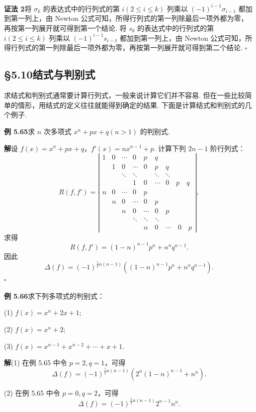 \documentclass[UTF8, 12pt, fontset=fandol, oneside]{ctexart}
\begin{document}
\noindent\textbf{证法 2}\quad 将 $\sigma_k$ 的表达式中的行列式的第 $i(2\le i\le k)$ 列乘以 $(-1)^{i-1}\sigma_{i-1}$ 都加到第一列上，由 Newton 公式可知，所得行列式的第一列除最后一项外都为零，再按第一列展开就可得到第一个结论. 将 $s_k$ 的表达式中的行列式的第 $i(2\le i\le k)$ 列乘以 $(-1)^{i-1}s_{i-1}$ 都加到第一列上，由 Newton 公式可知，所得行列式的第一列除最后一项外都为零，再按第一列展开就可得到第二个结论. \hfill $\square$

\subsection*{§5.10\quad 结式与判别式}

求结式和判别式通常要计算行列式，一般来说计算它们并不容易. 但在一些比较简单的情形，用结式的定义往往就能得到确定的结果. 下面是计算结式和判别式的几个例子.

\noindent\textbf{例 5.65}\quad 求 $n$ 次多项式 $x^n+px+q(n>1)$ 的判别式.

\noindent\textbf{解}\quad 设 $f(x)=x^n+px+q$，$f'(x)=nx^{n-1}+p$. 计算下列 $2n-1$ 阶行列式：
\[
R(f,f')=
\left|\begin{array}{ccccccc}
1 & 0 & \cdots & 0 & p & q & \\
 & 1 & 0 & \cdots & 0 & p & q\\
 & & \ddots & \ddots & & \ddots & \ddots\\
 & & & 1 & 0 & \cdots & 0\quad p\quad q\\
n & 0 & \cdots & 0 & p & & \\
 & n & 0 & \cdots & 0 & p & \\
 & & n & 0 & \cdots & 0 & p\\
 & & & \ddots & \ddots & \ddots & \\
 & & & & n & 0 & \cdots\quad 0\quad p
\end{array}\right|,
\]
求得
\[
R(f,f')=(1-n)^{n-1}p^n+n^nq^{n-1}.
\]
因此
\[
\Delta(f)=(-1)^{\frac12 n(n-1)}\left((1-n)^{n-1}p^n+n^nq^{n-1}\right).
\]
\hfill $\square$

\noindent\textbf{例 5.66}\quad 求下列多项式的判别式：

(1) $f(x)=x^n+2x+1$;

(2) $f(x)=x^n+2$;

(3) $f(x)=x^{n-1}+x^{n-2}+\cdots+x+1$.

\noindent\textbf{解}\quad (1) 在例 5.65 中令 $p=2,q=1$，可得
\[
\Delta(f)=(-1)^{\frac12 n(n-1)}\left(2^n(1-n)^{n-1}+n^n\right).
\]

(2) 在例 5.65 中令 $p=0,q=2$，可得
\[
\Delta(f)=(-1)^{\frac12 n(n-1)}2^{n-1}n^n.
\]
\end{document}
